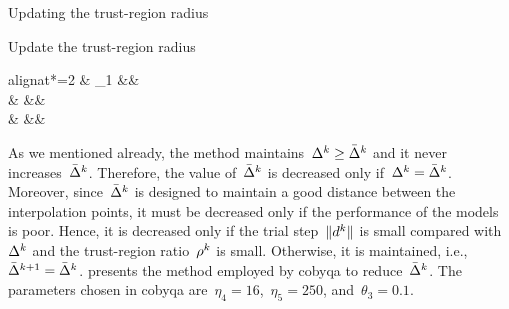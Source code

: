 \begin{algorithm}
    \caption{Updating the trust-region radius}
    \label{alg:update-trust-region-radius}
    \DontPrintSemicolon
    \onehalfspacing
    Update the trust-region radius
    \begin{algoempheq}[left={\rad[k + 1] \gets \empheqlbrace}]{alignat*=2}
        & \theta_1 \rad[k]                                                                      && \quad {}\\
        & \min \set{\theta_1 \rad[k], \norm{\step}}                                             && \quad {}\\
        & \min {}  && \quad {}
    \end{algoempheq}
    \If{$\rad[k + 1] \le \eta_3 \radlb[k]$}{
        $\rad[k + 1] \gets \radlb[k]$\;
    }
\end{algorithm}

As we mentioned already, the method maintains~$\rad[k] \ge \radlb[k]$ and it never increases~$\radlb[k]$.
Therefore, the value of~$\radlb[k]$ is decreased only if~$\rad[k] = \radlb[k]$.
Moreover, since~$\radlb[k]$ is designed to maintain a good distance between the interpolation points, it must be decreased only if the performance of the models is poor.
Hence, it is decreased only if the trial step~$\norm{\step[k]}$ is small compared with~$\rad[k]$ and the trust-region ratio~$\ratio[k]$ is small.
Otherwise, it is maintained, i.e.,~$\radlb[k + 1] = \radlb[k]$.
 presents the method employed by \gls{cobyqa} to reduce~$\radlb[k]$.
The parameters chosen in \gls{cobyqa} are~$\eta_4 = 16$,~$\eta_5 = 250$, and~$\theta_3 = 0.1$.

